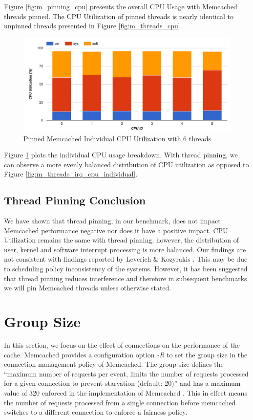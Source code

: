 Figure \ref{fig:m_pinning_cpu} presents the overall CPU Usage with Memcached threads pinned. The CPU Utilization of pinned threads is nearly identical to unpinned threads presented in Figure \ref{fig:m_threads_cpu}.

\begin{figure}[h]
    \includegraphics[width=\textwidth]{./res2/m_pinning_cpu_individual.png}
    \caption{Pinned Memcached Individual CPU Utilization with 6 threads}
    \label{fig:m_pinning_cpu_individual}
\end{figure}

Figure \ref{fig:m_pinning_cpu_individual} plots the individual CPU usage breakdown. With thread pinning, we can observe a more evenly balanced distribution of CPU utilization as opposed to Figure \ref{fig:m_threads_irq_cpu_individual}.

\subsection{Thread Pinning Conclusion}
We have shown that thread pinning, in our benchmark, does not impact Memcached performance negative nor does it have a positive impact. CPU Utilization remains the same with thread pinning, however, the distribution of user, kernel and software interrupt processing is more balanced. Our findings are not consistent with findings reported by Leverich \& Kozyrakis \cite{leverich2014reconciling}. This may be due to scheduling policy inconsistency of the systems. However, it has been suggested that thread pinning reduces interference and therefore in subsequent benchmarks we will pin Memcached threads unless otherwise stated.



\section{Group Size}
In this section, we focus on the effect of connections on the performance of the cache. Memcached provides a configuration option \textit{-R} to set the group size in the connection management policy of Memcached. The group size defines the ``maximum number of requests per event, limits the number of requests processed for a given connection to prevent starvation (default: 20)'' \cite{interactive2006memcached} and has a maximum value of 320 enforced in the implementation of Memcached \cite{blake54does}. This in effect means the number of requests processed from a single connection before memcached switches to a different connection to enforce a fairness policy.

